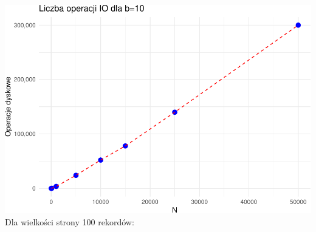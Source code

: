 \documentclass[
]{article}
\begin{document}
\includegraphics{sbd1_files/figure-latex/unnamed-chunk-2-1} Dla
wielkości strony 100 rekordów:
\end{document}
